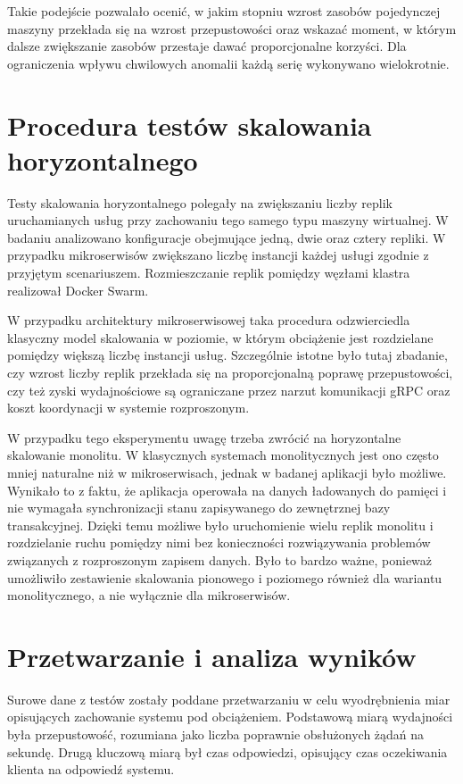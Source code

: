Takie podejście pozwalało ocenić, w jakim stopniu wzrost zasobów pojedynczej maszyny przekłada się na wzrost przepustowości oraz wskazać moment, w którym dalsze zwiększanie zasobów przestaje dawać proporcjonalne korzyści. Dla ograniczenia wpływu chwilowych anomalii każdą serię wykonywano wielokrotnie.

\section{Procedura testów skalowania horyzontalnego}

Testy skalowania horyzontalnego polegały na zwiększaniu liczby replik uruchamianych usług przy zachowaniu tego samego typu maszyny wirtualnej. W badaniu analizowano konfiguracje obejmujące jedną, dwie oraz cztery repliki. W przypadku mikroserwisów zwiększano liczbę instancji każdej usługi zgodnie z przyjętym scenariuszem. Rozmieszczanie replik pomiędzy węzłami klastra realizował Docker Swarm.

W przypadku architektury mikroserwisowej taka procedura odzwierciedla klasyczny model skalowania w poziomie, w którym obciążenie jest rozdzielane pomiędzy większą liczbę instancji usług. Szczególnie istotne było tutaj zbadanie, czy wzrost liczby replik przekłada się na proporcjonalną poprawę przepustowości, czy też zyski wydajnościowe są ograniczane przez narzut komunikacji gRPC oraz koszt koordynacji w systemie rozproszonym.

W przypadku tego eksperymentu uwagę trzeba zwrócić na horyzontalne skalowanie monolitu. W klasycznych systemach monolitycznych jest ono często mniej naturalne niż w mikroserwisach, jednak w badanej aplikacji było możliwe. Wynikało to z faktu, że aplikacja operowała na danych ładowanych do pamięci i nie wymagała synchronizacji stanu zapisywanego do zewnętrznej bazy transakcyjnej. Dzięki temu możliwe było uruchomienie wielu replik monolitu i rozdzielanie ruchu pomiędzy nimi bez konieczności rozwiązywania problemów związanych z rozproszonym zapisem danych. Było to bardzo ważne, ponieważ umożliwiło zestawienie skalowania pionowego i poziomego również dla wariantu monolitycznego, a nie wyłącznie dla mikroserwisów.

\section{Przetwarzanie i analiza wyników}

Surowe dane z testów zostały poddane przetwarzaniu w celu wyodrębnienia miar opisujących zachowanie systemu pod obciążeniem. Podstawową miarą wydajności była przepustowość, rozumiana jako liczba poprawnie obsłużonych żądań na sekundę. Drugą kluczową miarą był czas odpowiedzi, opisujący czas oczekiwania klienta na odpowiedź systemu.

